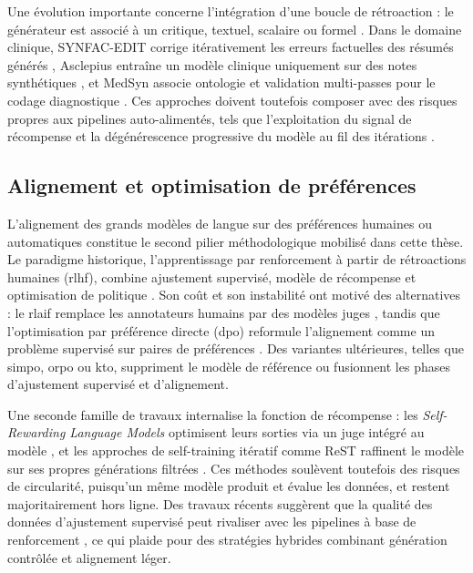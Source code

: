 Une évolution importante concerne l'intégration d'une boucle de rétroaction : le générateur est associé à un critique, textuel, scalaire ou formel \citep{madaan2023selfrefine}.
Dans le domaine clinique, SYNFAC-EDIT corrige itérativement les erreurs factuelles des résumés générés \citep{miller2024synfacedit}, Asclepius entraîne un modèle clinique uniquement sur des notes synthétiques \citep{kweon2024asclepius}, et MedSyn associe ontologie et validation multi-passes pour le codage diagnostique \citep{kumichev2024medsyn}.
Ces approches doivent toutefois composer avec des risques propres aux pipelines auto-alimentés, tels que l'exploitation du signal de récompense et la dégénérescence progressive du modèle au fil des itérations \citep{shumailov2024modelcollapse}.

\subsection{Alignement et optimisation de préférences}

L'alignement des grands modèles de langue sur des préférences humaines ou automatiques constitue le second pilier méthodologique mobilisé dans cette thèse.
Le paradigme historique, l'apprentissage par renforcement à partir de rétroactions humaines (\gls{rlhf}), combine ajustement supervisé, modèle de récompense et optimisation de politique \citep{ouyang2022training}.
Son coût et son instabilité ont motivé des alternatives : le \gls{rlaif} remplace les annotateurs humains par des modèles juges \citep{lee2023rlaif}, tandis que l'optimisation par préférence directe (\gls{dpo}) reformule l'alignement comme un problème supervisé sur paires de préférences \citep{rafailov2023dpo}.
Des variantes ultérieures, telles que \gls{simpo}, \gls{orpo} ou \gls{kto}, suppriment le modèle de référence ou fusionnent les phases d'ajustement supervisé et d'alignement.

Une seconde famille de travaux internalise la fonction de récompense : les \emph{Self-Rewarding Language Models} optimisent leurs sorties via un juge intégré au modèle \citep{yuan2024selfrewarding}, et les approches de self-training itératif comme ReST raffinent le modèle sur ses propres générations filtrées \citep{gulcehre2023rest}.
Ces méthodes soulèvent toutefois des risques de circularité, puisqu'un même modèle produit et évalue les données, et restent majoritairement hors ligne.
Des travaux récents suggèrent que la qualité des données d'ajustement supervisé peut rivaliser avec les pipelines à base de renforcement \citep{kirk2024effects}, ce qui plaide pour des stratégies hybrides combinant génération contrôlée et alignement léger.

